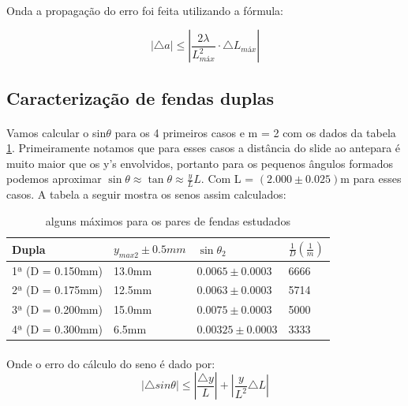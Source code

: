 \documentclass[a4paper,11pt]{article}
\begin{document}
\paragraph{}Onda a propagação do erro foi feita utilizando a fórmula:

\begin{displaymath}
	|\triangle a| \leq |\frac{2\lambda }{L_{máx}^2} \cdot \triangle L_{máx}|
\end{displaymath}

\subsection{Caracterização de fendas duplas}
\paragraph{}Vamos calcular o sin$\theta$ para os 4 primeiros casos e  m = 2
 com os dados da tabela \ref{tab:fendas-multiplas}. Primeiramente notamos que 
para esses casos a distância do slide ao antepara é muito maior que os y's 
envolvidos, portanto para os pequenos ângulos formados podemos aproximar 
$\sin \theta \approx \tan \theta \approx \frac{y}{L}L$. 
Com L = $(2.000 \pm 0.025)$m para esses casos. A tabela a seguir mostra os senos
assim calculados:

 \begin{table}[!htp]
    \centering
    \begin{tabular}{|l|l|l|l|}\hline
	Dupla	& $y_{max 2} \pm 0.5mm$ & $\sin \theta _ 2$ &$ \frac{1}{D}(\frac{1}{m})$
					 \\ \hline
      	1ª (D = 0.150mm) &13.0mm &$0.0065 \pm 0.0003	$& 6666 
			\\ \hline
      	2ª (D = 0.175mm) &12.5mm &$0.0063 \pm 0.0003	$& 5714
			\\ \hline
      	3ª (D = 0.200mm) &15.0mm &$0.0075 \pm 0.0003	$& 5000
			\\ \hline
	4ª (D = 0.300mm) &6.5mm  &$0.00325 \pm 0.0003	$& 3333
			\\ \hline
\end{tabular}
\caption{alguns máximos para os pares de fendas estudados}
\label{tab:fendas-multiplas}
\end{table}
\paragraph{}Onde o erro do cálculo do seno é dado por:
\begin{displaymath}
	|\triangle sin \theta|
		 \leq 
	|\frac{\triangle y }{L}| +|\frac{y}{L^2} \triangle L|
\end{displaymath}
\end{document}
